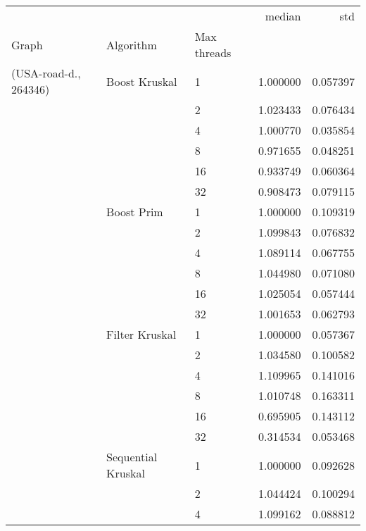 \begin{tabular}{lllrr}
\toprule
                       &                    &    &    median &       std \\
Graph & Algorithm & Max threads &           &           \\
\midrule
(USA-road-d., 264346) & Boost Kruskal & 1  &  1.000000 &  0.057397 \\
                       &                    & 2  &  1.023433 &  0.076434 \\
                       &                    & 4  &  1.000770 &  0.035854 \\
                       &                    & 8  &  0.971655 &  0.048251 \\
                       &                    & 16 &  0.933749 &  0.060364 \\
                       &                    & 32 &  0.908473 &  0.079115 \\
                       & Boost Prim & 1  &  1.000000 &  0.109319 \\
                       &                    & 2  &  1.099843 &  0.076832 \\
                       &                    & 4  &  1.089114 &  0.067755 \\
                       &                    & 8  &  1.044980 &  0.071080 \\
                       &                    & 16 &  1.025054 &  0.057444 \\
                       &                    & 32 &  1.001653 &  0.062793 \\
                       & Filter Kruskal & 1  &  1.000000 &  0.057367 \\
                       &                    & 2  &  1.034580 &  0.100582 \\
                       &                    & 4  &  1.109965 &  0.141016 \\
                       &                    & 8  &  1.010748 &  0.163311 \\
                       &                    & 16 &  0.695905 &  0.143112 \\
                       &                    & 32 &  0.314534 &  0.053468 \\
                       & Sequential Kruskal & 1  &  1.000000 &  0.092628 \\
                       &                    & 2  &  1.044424 &  0.100294 \\
                       &                    & 4  &  1.099162 &  0.088812 \\

\end{tabular}
